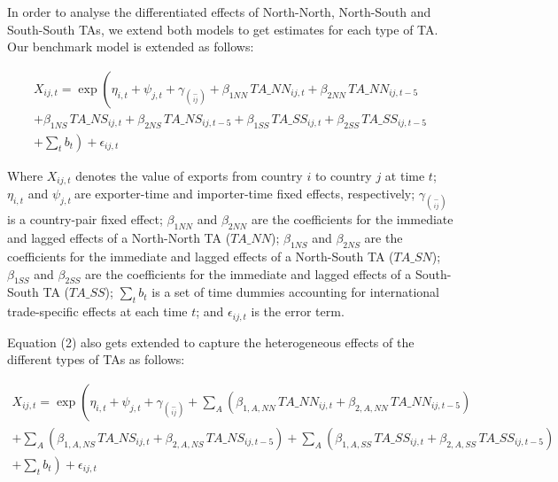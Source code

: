 \documentclass[12pt]{article}%
\begin{document}
%
In order to analyse the differentiated effects of North-North,
North-South and South-South TAs, we extend both models to get estimates
for each type of TA. Our benchmark model is extended as follows:

\begin{multline}
    X_{ij,t} = \exp\left(\eta_{i,t} + \psi_{j,t} + \gamma_{\binom{-}{ij}} + \beta_{1NN} \, TA\_NN_{ij,t} + \beta_{2NN} \, TA\_NN_{ij,t-5} \right. \\
    + \beta_{1NS} \, TA\_NS_{ij,t} + \beta_{2NS} \, TA\_NS_{ij,t-5} + \beta_{1SS} \, TA\_SS_{ij,t} + \beta_{2SS} \, TA\_SS_{ij,t-5} \\
    + \left. \sum_{t} b_{t} \right) + \epsilon_{ij,t}
\end{multline}

Where \(X_{ij,t}\)\hspace{0pt} denotes the value of exports from country
\(i\) to country \(j\) at time \(t\); \(\eta_{i,t}\) and
\(\psi_{j,t}\ \)are exporter-time and importer-time fixed effects,
respectively; \(\gamma_{\binom{-}{ij}}\) is a country-pair fixed effect;
\hspace{0pt}\(\beta_{1NN}\) and \(\beta_{2NN}\) are the coefficients for
the immediate and lagged effects of a North-North TA (\(TA\_ NN\));
\hspace{0pt}\hspace{0pt}\(\beta_{1NS}\) and \(\beta_{2NS}\) are the
coefficients for the immediate and lagged effects of a North-South TA
(\(TA\_ SN\)); \hspace{0pt}\hspace{0pt}\(\beta_{1SS}\) and
\(\beta_{2SS}\) are the coefficients for the immediate and lagged
effects of a South-South TA (\(TA\_ SS\)); \(\sum_{t}^{}b_{t}\) is a set
of time dummies accounting for international trade-specific effects at
each time \(t\); and \(\epsilon_{ij,t}\) is the error term.

Equation (2) also gets extended to capture the heterogeneous effects of
the different types of TAs as follows:

\begin{multline}
    X_{ij,t} = \exp\left(\eta_{i,t} + \psi_{j,t} + \gamma_{\binom{-}{ij}} + \sum_{A}\left(\beta_{1,A,NN} \, TA\_NN_{ij,t} + \beta_{2,A,NN} \, TA\_NN_{ij,t-5}\right) \right. \\
    + \sum_{A}\left(\beta_{1,A,NS} \, TA\_NS_{ij,t} + \beta_{2,A,NS} \, TA\_NS_{ij,t-5}\right) + \sum_{A}\left(\beta_{1,A,SS} \, TA\_SS_{ij,t} + \beta_{2,A,SS} \, TA\_SS_{ij,t-5}\right) \\
    + \left. \sum_{t} b_{t} \right) + \epsilon_{ij,t}
\end{multline}
\end{document}
